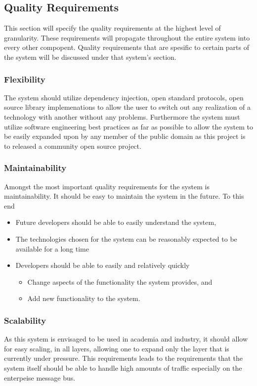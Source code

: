 \subsection{Quality Requirements}
This section will specify the quality requirements at the highest level of
granularity. These requirements will propagate throughout the entire system
into every other compopent. Quality requirements that are spesific to certain
parts of the system will be discussed under that system's section.

\subsubsection{Flexibility}
The system should utilize dependency injection, open standard protocols,
open source library implemenations to allow the user to switch out any
realization of a technology with another without any problems. Furthermore
the system must utilize software engineering best practices as far as possible
to allow the system to be easily expanded upon by any member of the public
domain as this project is to released a community open source project.

\subsubsection{Maintainability}
Amongst the most important quality requirements for the system is
maintainability. It should be easy to maintain the system in the future. To this end
\begin{itemize}
	\item Future developers should be able to easily understand the system,
	\item The technologies chosen for the system can be reasonably expected to be available for a long time
	\item Developers should be able to easily and relatively quickly
	\begin{itemize}
		\item Change aspects of the functionality the system provides, and
		\item Add new functionality to the system.
	\end{itemize}
\end{itemize}

\subsubsection{Scalability}
As this system is envisaged to be used in academia and industry, it should allow
for easy scaling, in all layers, allowing one to expand only the layer that is
currently under pressure. This requirements leads to the requirements that the
system itself should be able to handle high amounts of traffic especially on the
enterpeise message bus.

